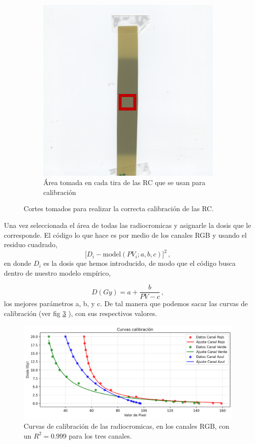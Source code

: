 \documentclass[onecolumn,12pt]{article} %
\begin{document}
\begin{figure}[H]
\begin{subfigure}[b]{0.5\textwidth}
        \centering
        \includegraphics[width=\textwidth]{img_exp/scanCalibRC.png}
        \caption{Área tomada en cada tira de las RC que se usan para calibración}
        \label{fig:areatomadaRC}
    \end{subfigure}
    \caption{Cortes tomados para realizar la correcta calibración  de las RC.}
    \label{fig:calibracionRC}
\end{figure}

Una vez seleccionada el área de todas las radiocromicas y asignarle  la dosis que le corresponde. El código lo que hace es por medio de los canales RGB y usando el residuo cuadrado, 
\begin{equation}
    \bigl[D_i - \mathrm{model}(PV_i; a, b, c)\bigr]^2\, ,
\end{equation}
en donde $D_i$ es la dosis que hemos introducido, de modo que el código busca dentro de nuestro modelo empírico, 

\begin{equation}
    D(Gy) = a + \frac{b}{PV - c} \, ,
\end{equation}
los mejores parámetros a, b, y c. De tal manera que podemos sacar las curvas de calibración (ver fig \ref{fig:curvaCalRC} ), con sus respectivos valores. 
\begin{figure}[H]
    \centering
    \includegraphics[width=0.7\linewidth]{img_exp/calibration_curves.png}
    \caption{Curvas de calibración de las radiocromicas, en los canales RGB, con un $R^2=0.999$ para los tres canales.} 
    \label{fig:curvaCalRC}
\end{figure}
\end{document}
